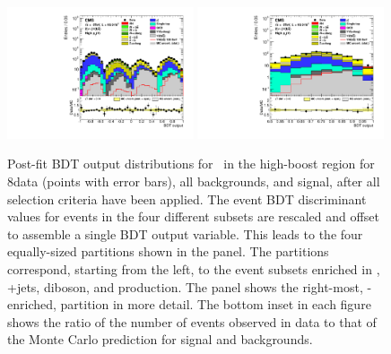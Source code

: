 \documentclass[12pt,twoside,a4paper,cmspaper,final,collab]{cms-tdr}
\begin{document}
\begin{figure}[htbp]
  \begin{center}
    \includegraphics[width=0.49\textwidth]{BDT_Znn_HighPt_ZnunuHighPt_8TeV_PostFit_s}
    \includegraphics[width=0.49\textwidth]{BDT_Znn_HighPt_Last_ZnunuHighPt_8TeV_PostFit_s}
\caption{Post-fit BDT output distributions for \ZnnH\ in the
      high-boost region for 8\TeV data (points with error bars), all
    backgrounds, and signal, after all selection criteria have been
    applied. The event BDT discriminant values for events in the four
    different subsets are rescaled and offset to assemble a single BDT output variable.
This leads to the four equally-sized partitions shown in the \cmsLeft
panel. The partitions correspond, starting from the left, to the event
subsets enriched in \ttbar, {\Vvar}+jets, diboson, and \VH production.
The \cmsRight panel shows the right-most, \VH-enriched, partition in more detail.
The bottom inset in each figure shows the ratio of the number of events observed in data to that of the Monte Carlo prediction for signal and backgrounds.}
    \label{fig:mBDT_Znn_example}
  \end{center}
\end{figure}
\end{document}
